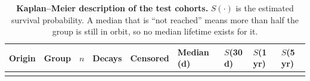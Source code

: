 \documentclass[3p,times,twocolumn]{elsarticle}
\begin{document}
\begin{table}[t]
\centering
\footnotesize
\caption{\textbf{Kaplan--Meier description of the test cohorts.}
\(S(\cdot)\) is the estimated survival probability. A median that is
``not reached'' means more than half the group is still in orbit, so no
median lifetime exists for it.}\label{tbl:km}
\begin{tabular}{@{}
>{\raggedright\arraybackslash}p{}
  >{\raggedright\arraybackslash}p{}
  >{\raggedleft\arraybackslash}p{}
  >{\raggedleft\arraybackslash}p{}
  >{\raggedleft\arraybackslash}p{}
  >{\raggedleft\arraybackslash}p{}
  >{\raggedleft\arraybackslash}p{}
  >{\raggedleft\arraybackslash}p{}
  >{\raggedleft\arraybackslash}p{}@{}}
\toprule\noalign{}
\begin{minipage}[b]{\linewidth}\raggedright
Origin
\end{minipage} & \begin{minipage}[b]{\linewidth}\raggedright
Group
\end{minipage} & \begin{minipage}[b]{\linewidth}\raggedleft
\(n\)
\end{minipage} & \begin{minipage}[b]{\linewidth}\raggedleft
Decays
\end{minipage} & \begin{minipage}[b]{\linewidth}\raggedleft
Censored
\end{minipage} & \begin{minipage}[b]{\linewidth}\raggedleft
Median (d)
\end{minipage} & \begin{minipage}[b]{\linewidth}\raggedleft
\(S\)(30 d)
\end{minipage} & \begin{minipage}[b]{\linewidth}\raggedleft
\(S\)(1 yr)
\end{minipage} & \begin{minipage}[b]{\linewidth}\raggedleft
\(S\)(5 yr)
\end{minipage} \\
\midrule\noalign{}

\bottomrule\noalign{}


\end{tabular}
\end{table}
\end{document}
